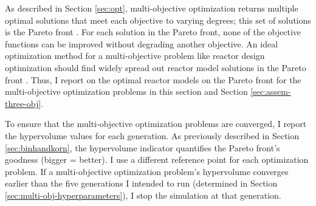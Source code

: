 As described in Section \ref{sec:opt}, multi-objective optimization returns 
multiple optimal solutions that meet each objective to varying degrees; this set of 
solutions is the Pareto front \cite{deb_multi-objective_2001}. 
For each solution in the Pareto front, none of the objective functions can be 
improved without degrading another objective.
An ideal optimization method for a multi-objective problem like reactor design 
optimization should find widely spread out reactor model solutions in the Pareto front 
\cite{deb_multi-objective_2001}. 
Thus, I report on the optimal reactor models on the Pareto front for the multi-objective 
optimization problems in this section and Section \ref{sec:assem-three-obj}. 

To ensure that the multi-objective optimization problems are converged, I report the 
hypervolume values for each generation. 
As previously described in Section \ref{sec:binhandkorn}, the hypervolume indicator 
quantifies the Pareto front's goodness (bigger = better).
I use a different reference point for each optimization problem. 
If a multi-objective optimization problem's hypervolume converges earlier than the 
five generations I intended to run (determined in Section 
\ref{sec:multi-obj-hyperparameters}), I stop the simulation at that generation. 

